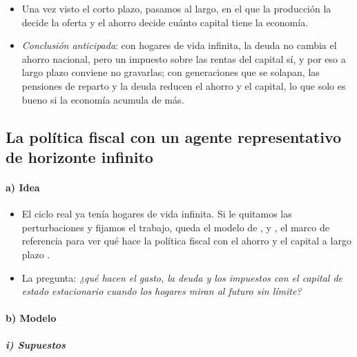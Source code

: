 \documentclass[11pt]{article}
\begin{document}
\begin{itemize}
\item Una vez visto el corto plazo, pasamos al largo, en el que la producción la decide la oferta y el ahorro decide cuánto capital tiene la economía.
\item \emph{Conclusión anticipada}: con hogares de vida infinita, la deuda no cambia el ahorro nacional, pero un impuesto sobre las rentas del capital sí, y por eso a largo plazo conviene no gravarlas; con generaciones que se solapan, las pensiones de reparto y la deuda reducen el ahorro y el capital, lo que solo es bueno si la economía acumula de más.
\end{itemize}

\subsection{La política fiscal con un agente representativo de horizonte infinito}\label{sec:horizonte-infinito}

\paragraph{a) Idea}

\begin{itemize}
\item El ciclo real ya tenía hogares de vida infinita. Si le quitamos las perturbaciones y fijamos el trabajo, queda el modelo de ,  y , el marco de referencia para ver qué hace la política fiscal con el ahorro y el capital a largo plazo .
\item La pregunta: \emph{¿qué hacen el gasto, la deuda y los impuestos con el capital de estado estacionario cuando los hogares miran al futuro sin límite?}
\end{itemize}

\paragraph{b) Modelo}

\subparagraph{i) Supuestos}
\end{document}
